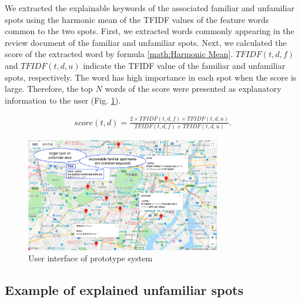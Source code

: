 \documentclass[journal]{IAENGtran}
\begin{document}
We extracted the explainable keywords of the associated familiar and unfamiliar spots using the harmonic mean of the TFIDF values of the feature words common to the two spots.
First, we extracted words commonly appearing in the review document of the familiar and unfamiliar spots.
Next, we calculated the score of the extracted word by formula \ref{math:Harmonic Mean}. $TFIDF(t,d,f)$ and $TFIDF(t,d,u)$ indicate the TFIDF value of the familiar and unfamiliar spots, respectively.
The word has high importance in each spot when the score is large.
Therefore, the top $N$ words of the score were presented as explanatory information to the user (Fig. \ref{fig:Photo_Map}).

\begin{eqnarray}
  score(t,d) = \frac{2 \times TFIDF(t,d,f) \times TFIDF(t,d,u)}{TFIDF(t,d,f) + TFIDF(t,d,u)}.
  \label{math:Harmonic Mean}
\end{eqnarray}

\begin{figure}[t]
  \begin{center}
    \includegraphics[clip,width=8.5cm,bb=0 0 1289 750]{picture/Photo_Map3_eng.png}
    \caption{User interface of prototype system}
    \label{fig:Photo_Map}
   \end{center}
\end{figure}

\subsection{Example of explained unfamiliar spots}
\label{subsec:Example of explained unfamiliar spots}
\end{document}
